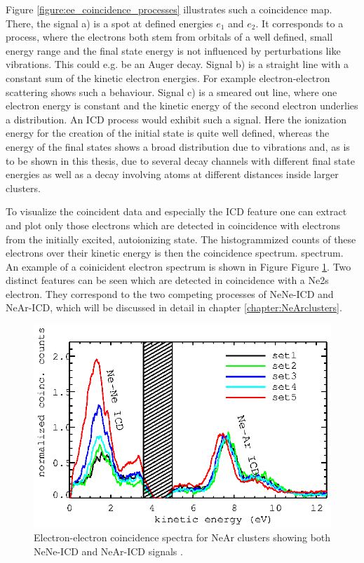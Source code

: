 Figure \ref{figure:ee_coincidence_processes} illustrates such a coincidence
map. There, the signal a) is a spot at defined energies $e_1$ and $e_2$.
It corresponds to a process, where the electrons both stem from orbitals
of a well defined, small energy range and the final state energy is not
influenced by perturbations like vibrations. This could e.g. be an Auger
decay.
Signal b) is a straight line with a constant sum of the kinetic electron
energies. For example electron-electron scattering shows such a behaviour.
Signal c) is a smeared out line, where one electron energy is constant
and the kinetic energy of the second electron underlies a distribution.
An ICD process would exhibit such a signal. Here the ionization energy
for the creation of the initial state is quite well defined, whereas
the energy of the final states shows a broad distribution due to
vibrations and, as is to be shown in this thesis, due to several decay
channels with different final state energies as well as a decay involving
atoms at different distances inside larger clusters.

To visualize the coincident data and especially the ICD feature one can
extract and plot only those electrons which are detected in coincidence with
electrons from the initially excited, autoionizing state.
The histogrammized counts of these electrons over their kinetic energy is
then the coincidence spectrum.
spectrum. An example  of a coinicident electron spectrum is shown in Figure
Figure \ref{figure:ICD_spectrum_example}. Two distinct features can be
seen which are detected in coincidence with a Ne2s electron. They correspond
to the two competing processes of NeNe-ICD and NeAr-ICD, which will be
discussed in detail in chapter \ref{chapter:NeArclusters}.


\begin{figure}[h]
  \centering
  \includegraphics{pics/exp_near_coinc_sets.eps}
  \caption{Electron-electron coincidence spectra for NeAr clusters
           showing both NeNe-ICD and NeAr-ICD signals \cite{Fasshauer14_1}.}
  \label{figure:ICD_spectrum_example}
\end{figure}

